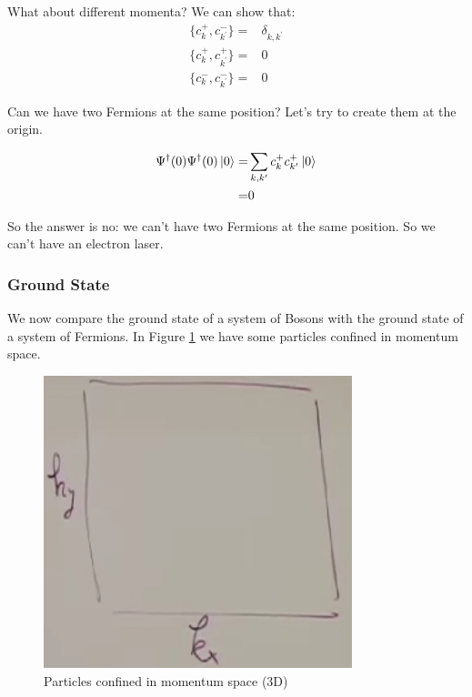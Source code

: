 \documentclass[]{article}
\begin{document}
What about different momenta? We can show that:
\begin{align*}
\{c^+_k,c^-_{k^\prime} \} =& \delta_{k,k^\prime} \\
\{c^+_k,c^+_{k^\prime} \} =&0 \\
\{c^-_k,c^-_{k^\prime} \} =&0
\end{align*}

Can we have two Fermions at the same position? Let's try to create them at the origin.

\begin{align*}
\Psi^\dagger(0) \Psi^\dagger(0) \ket{0} =& \sum_{k,k^\prime} c^+_k c^+_{k^\prime} \ket{0}\\
=& 0
\end{align*}

So the answer is no: we can't have two Fermions at the same position. So we can't have an electron laser.

\subsubsection{Ground State}
We now compare the ground state of a system of Bosons with the ground state of a system of Fermions. In Figure \ref{fig:electons:confined:momentum} we have some particles confined in momentum space.

\begin{figure}[H]
	\caption{Particles confined in momentum space (3D)}\label{fig:electons:confined:momentum}
	\includegraphics[width=0.8\textwidth]{electons-confined-momentum}
\end{figure}
\end{document}
